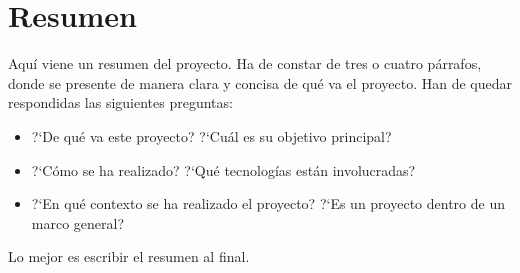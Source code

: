 \chapter*{Resumen}

Aqu\'i viene un resumen del proyecto. Ha de constar de tres o cuatro p\'arrafos, donde se presente de manera clara y concisa de qu\'e va el proyecto.
Han de quedar respondidas las siguientes preguntas:

\begin{itemize}
  \item ?`De qu\'e va este proyecto? ?`Cu\'al es su objetivo principal?
  \item ?`C\'omo se ha realizado? ?`Qu\'e tecnolog\'ias est\'an involucradas?
  \item ?`En qu\'e contexto se ha realizado el proyecto? ?`Es un proyecto
dentro de un marco general?
\end{itemize}

Lo mejor es escribir el resumen al final.